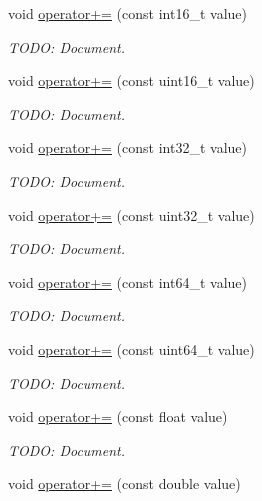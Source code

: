 \begin{DoxyCompactItemize}
void \hyperlink{class_power_1_1_string_a199f509027c45a73200cd8f6390953ca}{operator+=} (const int16\+\_\+t value)
\begin{DoxyCompactList}\small\item\em T\+O\+DO\+: Document. \end{DoxyCompactList}\item 
void \hyperlink{class_power_1_1_string_a9fc5761dcad661b80d309656efc381d4}{operator+=} (const uint16\+\_\+t value)
\begin{DoxyCompactList}\small\item\em T\+O\+DO\+: Document. \end{DoxyCompactList}\item 
void \hyperlink{class_power_1_1_string_a2e87aa213b473f2fd87da5563132d5b2}{operator+=} (const int32\+\_\+t value)
\begin{DoxyCompactList}\small\item\em T\+O\+DO\+: Document. \end{DoxyCompactList}\item 
void \hyperlink{class_power_1_1_string_ad2fdb962fe7425c518e9fcc533fb3f55}{operator+=} (const uint32\+\_\+t value)
\begin{DoxyCompactList}\small\item\em T\+O\+DO\+: Document. \end{DoxyCompactList}\item 
void \hyperlink{class_power_1_1_string_a4de514d070a1c7bf464e97f35868e37c}{operator+=} (const int64\+\_\+t value)
\begin{DoxyCompactList}\small\item\em T\+O\+DO\+: Document. \end{DoxyCompactList}\item 
void \hyperlink{class_power_1_1_string_a9ccf03d5cef8d756d82c7b198e65392d}{operator+=} (const uint64\+\_\+t value)
\begin{DoxyCompactList}\small\item\em T\+O\+DO\+: Document. \end{DoxyCompactList}\item 
void \hyperlink{class_power_1_1_string_a9ac2eb1de5bf6a9232e85abbcb4c9bf2}{operator+=} (const float value)
\begin{DoxyCompactList}\small\item\em T\+O\+DO\+: Document. \end{DoxyCompactList}\item 
void \hyperlink{class_power_1_1_string_a8689efc9a824d938249a78f02918e57d}{operator+=} (const double value)

\end{DoxyCompactItemize}

